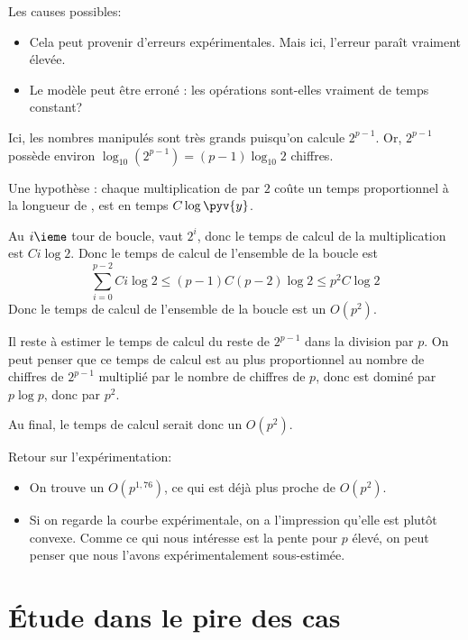 Les causes possibles:
\begin{itemize}
\item[\textbullet] Cela peut provenir d'erreurs expérimentales. Mais ici, l'erreur paraît vraiment 
élevée.
\item[\textbullet] Le modèle peut être erroné : les opérations sont-elles vraiment de temps constant?
\end{itemize}

Ici, les nombres manipulés sont très grands puisqu'on calcule
$2^{p-1}$. Or, $2^{p-1}$ possède environ $\log_{10} (2^{p-1}) =
(p-1)\log_{10} 2$ chiffres.

Une hypothèse : chaque multiplication de  par $2$ coûte un temps proportionnel à la longueur de , est en temps $C \log \pyv{y}$.

Au $i\ieme$ tour de boucle,  vaut $2^{i}$, donc le temps de
calcul de la multiplication est $C i \log 2$. Donc le temps de calcul
de l'ensemble de la boucle est
\begin{equation*}
  \sum_{i=0}^{p-2} C i \log 2 \leq (p-1) C (p-2)\log 2\leq p^{2}C\log 2
\end{equation*}
Donc le temps de calcul de l'ensemble de la boucle est un $O(p^{2})$.

Il reste à estimer le temps de calcul du reste de $2^{p-1}$ dans la
division par $p$. On peut penser que ce temps de calcul est au plus
proportionnel au nombre de chiffres de $2^{p-1}$ multiplié par le
nombre de chiffres de $p$, donc est dominé par $p\log p$, donc par
$p^{2}$.

Au final, le temps de calcul serait donc un $O(p^{2})$.

Retour sur l'expérimentation:
\begin{itemize}
\item[\textbullet] On trouve un $O(p^{1,76})$, ce qui est déjà plus proche de $O(p^{2})$.
\item[\textbullet] Si on regarde la courbe expérimentale, on a l'impression qu'elle
  est plutôt convexe. Comme ce qui nous intéresse est la pente pour
  $p$ élevé, on peut penser que nous l'avons expérimentalement sous-estimée.
\end{itemize}

\section{\'Etude dans le pire des cas}


